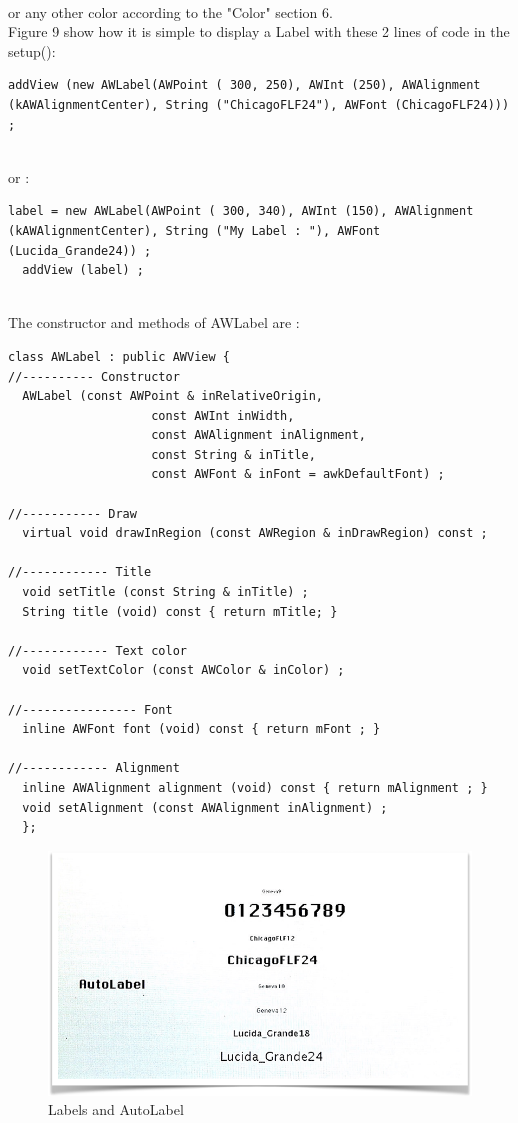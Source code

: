 \documentclass[a4paper,11pt]{extarticle}
\begin{document}
~\\ or any other color according to the "Color" section 6.
~\\ Figure 9 show how it is simple to display a Label with these 2 lines of code in the setup():

\begin{lstlisting}[language=Arduinonl]
  addView (new AWLabel(AWPoint ( 300, 250), AWInt (250), AWAlignment (kAWAlignmentCenter), String ("ChicagoFLF24"), AWFont (ChicagoFLF24))) ;
\end{lstlisting}

~\\ or :

\begin{lstlisting}[language=Arduinonl]
  label = new AWLabel(AWPoint ( 300, 340), AWInt (150), AWAlignment (kAWAlignmentCenter), String ("My Label : "), AWFont (Lucida_Grande24)) ;
  addView (label) ;
\end{lstlisting}

~\\ The constructor and methods of AWLabel are :

\begin{lstlisting}[language=Arduinonl]
class AWLabel : public AWView {
//---------- Constructor
  AWLabel (const AWPoint & inRelativeOrigin,
                    const AWInt inWidth,
                    const AWAlignment inAlignment,
                    const String & inTitle,
                    const AWFont & inFont = awkDefaultFont) ;

//----------- Draw
  virtual void drawInRegion (const AWRegion & inDrawRegion) const ;

//------------ Title
  void setTitle (const String & inTitle) ;
  String title (void) const { return mTitle; }

//------------ Text color
  void setTextColor (const AWColor & inColor) ;

//---------------- Font
  inline AWFont font (void) const { return mFont ; }

//------------ Alignment
  inline AWAlignment alignment (void) const { return mAlignment ; }
  void setAlignment (const AWAlignment inAlignment) ;
  };
\end{lstlisting}

\begin{figure}[htbp]
   \centering
   \includegraphics[scale=0.55]{AWFig9.png} 
   \caption{Labels and AutoLabel}
   \label{fig: 9}
\end{figure}
\end{document}
